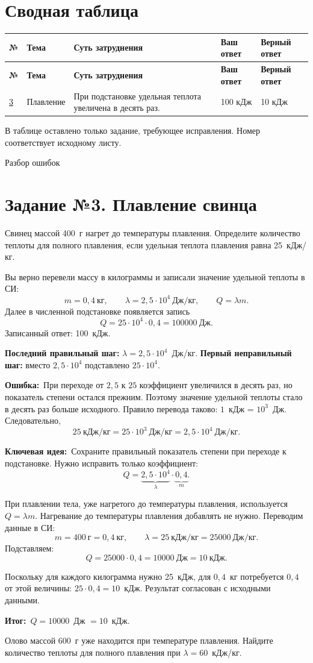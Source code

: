 \documentclass[a4paper,11pt]{article}
\newcommand{\TaskTitle}[2]{\phantomsection\label{task:#1}\section*{Задание №#1. #2}}
\newcommand{\Field}[1]{\par\vspace{3pt}{\bfseries #1}\par\vspace{-2pt}}
\newcommand{\ErrorLabel}{\textcolor{rednote}{\textbf{Ошибка:}}}
\newcommand{\IdeaLabel}{\textcolor{accent}{\textbf{Ключевая идея:}}}
\newcommand{\ResultLabel}{\textcolor{accent}{\textbf{Итог:}}}
\begin{document}
\section*{Сводная таблица}
\small
\renewcommand{\arraystretch}{1.38}
\begin{longtable}{@{}p{1.3cm}p{2.15cm}p{5cm}p{2.55cm}p{2.55cm}@{}}
\toprule
\textbf{№} & \textbf{Тема} & \textbf{Суть затруднения} & \textbf{Ваш ответ} & \textbf{Верный ответ}\\
\midrule
\endfirsthead
\toprule
\textbf{№} & \textbf{Тема} & \textbf{Суть затруднения} & \textbf{Ваш ответ} & \textbf{Верный ответ}\\
\midrule
\endhead
\hyperref[task:3]{3} & Плавление & При подстановке удельная теплота увеличена в десять раз. & 100 кДж & 10 кДж\\
\bottomrule
\end{longtable}
\normalsize
\medskip
\textcolor{muted}{В таблице оставлено только задание, требующее исправления. Номер соответствует исходному листу.}
\clearpage
\thispagestyle{empty}
\vspace*{0.34\textheight}
\begin{center}{\LARGE\textcolor{accent}{Разбор ошибок}}\end{center}
\clearpage
\TaskTitle{3}{Плавление свинца}
\Field{Текст задания}
Свинец массой 400~г нагрет до температуры плавления. Определите количество теплоты для полного плавления, если удельная теплота плавления равна 25~кДж/кг.
\Field{Ваше решение и ответ}
Вы верно перевели массу в килограммы и записали значение удельной теплоты в СИ:
\[
m=0{,}4\ \text{кг},\qquad \lambda=2{,}5\cdot10^4\ \text{Дж/кг},\qquad Q=\lambda m.
\]
Далее в численной подстановке появляется запись
\[
Q=25\cdot10^4\cdot0{,}4=100000\ \text{Дж}.
\]
Записанный ответ: 100~кДж.
\Field{Где именно возникает ошибка}
\textbf{Последний правильный шаг:} $\lambda=2{,}5\cdot10^4$~Дж/кг. \textbf{Первый неправильный шаг:} вместо $2{,}5\cdot10^4$ подставлено $25\cdot10^4$.
\Field{Почему это неверно}
\ErrorLabel\ При переходе от $2{,}5$ к $25$ коэффициент увеличился в десять раз, но показатель степени остался прежним. Поэтому значение удельной теплоты стало в десять раз больше исходного. Правило перевода таково: $1$~кДж = $10^3$~Дж. Следовательно,
\[
25\ \text{кДж/кг}=25\cdot10^3\ \text{Дж/кг}=2{,}5\cdot10^4\ \text{Дж/кг}.
\]
\Field{Ключевая идея и исправление}
\IdeaLabel\ Сохраните правильный показатель степени при переходе к подстановке. Нужно исправить только коэффициент:
\[
Q=\underbrace{2{,}5\cdot10^4}_{\lambda}\cdot\underbrace{0{,}4}_{m}.
\]
\Field{Полное правильное решение}
При плавлении тела, уже нагретого до температуры плавления, используется $Q=\lambda m$. Нагревание до температуры плавления добавлять не нужно. Переводим данные в СИ:
\[
m=400\ \text{г}=0{,}4\ \text{кг},\qquad
\lambda=25\ \text{кДж/кг}=25000\ \text{Дж/кг}.
\]
Подставляем:
\[
Q=25000\cdot0{,}4=10000\ \text{Дж}=10\ \text{кДж}.
\]
\Field{Проверка}
Поскольку для каждого килограмма нужно 25~кДж, для $0{,}4$~кг потребуется $0{,}4$ от этой величины: $25\cdot0{,}4=10$~кДж. Результат согласован с исходными данными.
\Field{Итог}
\ResultLabel\ $Q=10000$~Дж $=10$~кДж.
\Field{Задача на закрепление}
Олово массой 600~г уже находится при температуре плавления. Найдите количество теплоты для полного плавления при $\lambda=60$~кДж/кг.
\clearpage
\end{document}
